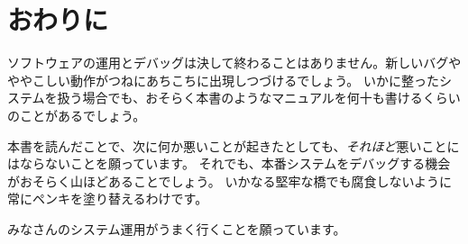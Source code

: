 \chapter{おわりに}

ソフトウェアの運用とデバッグは決して終わることはありません。新しいバグやややこしい動作がつねにあちこちに出現しつづけるでしょう。
いかに整ったシステムを扱う場合でも、おそらく本書のようなマニュアルを何十も書けるくらいのことがあるでしょう。

本書を読んだことで、次に何か悪いことが起きたとしても、\emph{それほど}悪いことにはならないことを願っています。
それでも、本番システムをデバッグする機会がおそらく山ほどあることでしょう。
いかなる堅牢な橋でも腐食しないように常にペンキを塗り替えるわけです。

みなさんのシステム運用がうまく行くことを願っています。

